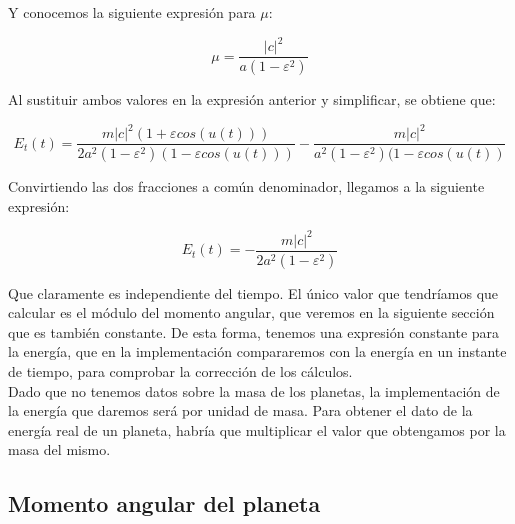 \documentclass[12pt]{article}
\begin{document}
Y conocemos la siguiente expresión para $\mu$:

\[
\mu = \frac{|c|^2}{a(1 - \varepsilon^2)}
\]

Al sustituir ambos valores en la expresión anterior y simplificar, se
obtiene que:

\[
E_t(t) = \frac{m|c|^2(1+\varepsilon
  cos(u(t)))}{2a^2(1-\varepsilon^2)(1-\varepsilon cos(u(t)))} -
\frac{m|c|^2}{a^2(1 - \varepsilon^2)(1-\varepsilon cos(u(t))}
\]

Convirtiendo las dos fracciones a común denominador, llegamos a la
siguiente expresión:

\[
E_t(t) = -\frac{m|c|^2}{2a^2(1-\varepsilon^2)}
\]

Que claramente es independiente del tiempo. El único valor que
tendríamos que calcular es el módulo del momento angular, que veremos
en la siguiente sección que es también constante. De esta forma,
tenemos una expresión constante para la energía, que en la
implementación compararemos con la energía en un instante de
tiempo, para comprobar la corrección de los cálculos.\\

Dado que no tenemos datos sobre la masa de los planetas, la
implementación de la energía que daremos será por unidad de masa. Para 
obtener el dato de la energía real de un planeta, habría que multiplicar
el valor que obtengamos por la masa del mismo.

\subsection{Momento angular del planeta}
\end{document}
